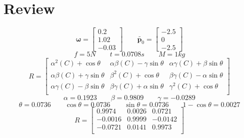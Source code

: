 \section{Review}
\begin{equation}\label{ma:Inertia Tensor}
\boldsymbol{\omega} = 
\begin{bmatrix}
   0.2 \\
   1.02 \\
  -0.03 
\end{bmatrix}
\qquad
\tilde{\mathbf{p}_{0}} = 
\begin{bmatrix}
   -2.5 \\
    0 \\
   -2.5 
\end{bmatrix}
\end{equation}
\begin{equation}
f = 5N
\qquad
t = 0.0708s
\qquad
M = 1kg
\end{equation}
\begin{equation}\label{ma:Rotation}
R = 
\begin{bmatrix}
  {\alpha}^{2}(C) + \cos\theta & 
  \alpha\beta(C) - \gamma\sin\theta & 
  \alpha\gamma(C) + \beta\sin\theta \\
  
  \alpha\beta(C) + \gamma\sin\theta & 
  {\beta}^{2}(C) + \cos\theta & 
  \beta\gamma(C) - \alpha\sin\theta \\
  
  \alpha\gamma(C) - \beta\sin\theta & 
  \beta\gamma(C) + \alpha\sin\theta & 
  {\gamma}^{2}(C) + \cos\theta \\
\end{bmatrix}
\end{equation}
\begin{equation}
\alpha = 0.1923
\qquad
\beta = 0.9809
\qquad
\gamma = -0.0289
\end{equation}
\begin{equation}
\theta = 0.0736
\qquad
\cos\theta = 0.0736
\qquad
\sin\theta = 0.0736
\qquad
1-\cos\theta = 0.0027
\end{equation}
\begin{equation}\label{ma:Rotation}
R = 
\begin{bmatrix}
   0.9974 & 
   0.0026 & 
   0.0721 \\
  
  -0.0016 & 
   0.9999 & 
  -0.0142 \\
  
  -0.0721 & 
   0.0141 & 
   0.9973 \\
\end{bmatrix}
\end{equation}
